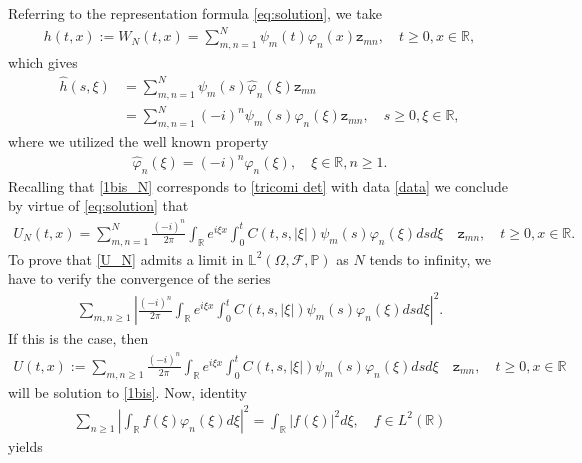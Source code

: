 \documentclass{article}
\begin{document}
Referring to the representation formula \eqref{eq:solution}, we take
\begin{align}\label{data}
h(t,x):=W_N(t,x)=\sum_{m,n= 1}^N\psi_m(t)\varphi_n(x)\mathtt{z}_{mn},\quad t\geq 0,x\in\mathbb{R}, 
\end{align}
which gives
\begin{align*}
\widehat{h}(s,\xi)&=\sum_{m,n= 1}^N\psi_m(s)\widehat{\varphi}_n(\xi)\mathtt{z}_{mn}\\
&=\sum_{m,n= 1}^N(-i)^n\psi_m(s)\varphi_n(\xi)\mathtt{z}_{mn},\quad s\geq 0,\xi\in\mathbb{R}, 
\end{align*}
where we utilized the well known property
\begin{align*}
\widehat{\varphi}_n(\xi)=(-i)^n\varphi_n(\xi),\quad \xi\in\mathbb{R},n\geq 1.
\end{align*} 
Recalling that \eqref{1bis_N} corresponds to \eqref{tricomi det} with data \eqref{data} we conclude by virtue of \eqref{eq:solution} that
\begin{align}\label{U_N}
U_N(t,x)=\sum_{m,n= 1}^N\frac{(-i)^n}{2\pi}\int_{\mathbb{R}} e^{i\xi x}
\int_{0}^{t} C(t,s,|\xi|)\psi_m(s)\varphi_n(\xi)dsd\xi\quad\!\!\!\!\mathtt{z}_{mn},\quad t\geq 0,x\in\mathbb{R}.
\end{align}
To prove that \eqref{U_N} admits a limit in $\mathbb{L}^2(\Omega,\mathcal{F},\mathbb{P})$ as $N$ tends to infinity, we have to verify the convergence of the series
\begin{align*}
\sum_{m,n\geq 1}\left|\frac{(-i)^n}{2\pi}\int_{\mathbb{R}} e^{i\xi x}
\int_{0}^{t} C(t,s,|\xi|)\psi_m(s)\varphi_n(\xi)dsd\xi\right|^2.
\end{align*}
If this is the case, then
\begin{align*}
U(t,x):=\sum_{m,n\geq 1}\frac{(-i)^n}{2\pi}\int_{\mathbb{R}} e^{i\xi x}
\int_{0}^{t} C(t,s,|\xi|)\psi_m(s)\varphi_n(\xi)dsd\xi\quad\!\!\!\!\mathtt{z}_{mn},\quad t\geq 0,x\in\mathbb{R}
\end{align*}
will be solution to \eqref{1bis}. Now, identity
\begin{align*}
\sum_{n\geq 1}\left|\int_{\mathbb{R}}f(\xi)\varphi_n(\xi)d\xi\right|^2=\int_{\mathbb{R}}|f(\xi)|^2d\xi,\quad f\in L^2(\mathbb{R})
\end{align*}
yields
\end{document}
